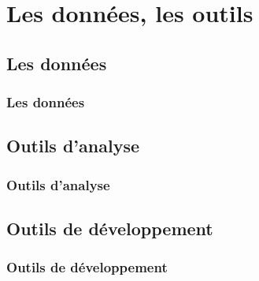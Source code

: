 \section{Les donn\'ees, les outils}

\subsection{Les donn\'ees}
\frame
{
\frametitle{Les donn\'ees}


}

\subsection{Outils d'analyse}
\frame
{
\frametitle{Outils d'analyse}


}

\subsection{Outils de d\'eveloppement}
\frame
{
\frametitle{Outils de d\'eveloppement}


}